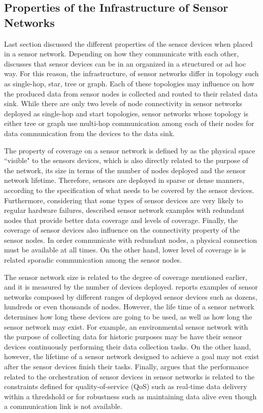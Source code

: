 \subsection{Properties of the Infrastructure of Sensor Networks}
\label{sec:sn-infrastructure}

Last section discussed the different properties of the sensor devices when
placed in a sensor network. Depending on how they communicate with each other,
\cite{sn-intro02} discusses that sensor devices can be in an organized in a
structured or ad hoc way. For this reason, the infrastructure, of sensor
networks differ in topology such as single-hop, star, tree or  graph. Each of
these topologies may influence on how the produced data from sensor nodes is
collected and routed to their related data sink. While there are only two
levels of node connectivity in sensor networks deployed as single-hop and start
topologies, sensor networks whose topology is either tree or graph use
multi-hop communication among each of their nodes for data communication from
the devices to the data sink.

The property of coverage on a sensor network is defined by
\cite{sn-intro01} as the physical space ``visible" to the sensors devices, which
is also directly related to the purpose of the network, its size in terms of
the number of nodes deployed and the sensor network lifetime. Therefore,
sensors are deployed in sparse or dense manners, according to the
specification of what needs to be covered by the sensor devices. Furthermore,
considering that some types of sensor devices are very likely to regular
hardware failures, \cite{sn-intro02} described sensor network examples with 
redundant nodes that provide better data coverage and levels of coverage.
Finally, the coverage of sensor devices also influence on the connectivity
property of the sensor nodes. In order communicate with redundant nodes, a
physical connection must be available at all times. On the other hand, lower
level of coverage is is related sporadic communication among the sensor nodes.

The sensor network size is related to the degree of coverage mentioned earlier,
and it is measured by the number of devices deployed. \cite{sn-intro01}
reports examples of sensor networks composed by different ranges of deployed
sensor devices such as dozens, hundreds or even thousands of nodes. However,
the life time of a sensor network determines how long these devices are going
to be used, as well as how long the sensor network may exist. For example, an
environmental sensor network \cite{sn-ex01} with the purpose of collecting data
for historic purposes may be have their sensor devices continuously performing
their data collection tasks. On the other hand, however, the lifetime of a
sensor network designed to achieve a goal may not exist after the sensor
devices finish their tasks. Finally, \cite{sn-intro02} argues that the
performance related to the orchestration of sensor devices in sensor networks
is related to the constraints defined for quality-of-service (QoS) such as
real-time data delivery within a thredshold or for robustness such as
maintaining data alive even though a communication link is not available.

